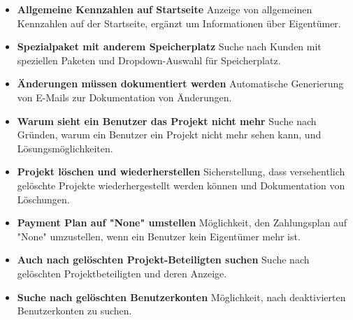 \begin{itemize}
    \item \textbf{Allgemeine Kennzahlen auf Startseite}
        \newline
        Anzeige von allgemeinen Kennzahlen auf der Startseite, ergänzt um Informationen über Eigentümer.
    \item \textbf{Spezialpaket mit anderem Speicherplatz}
        \newline
        Suche nach Kunden mit speziellen Paketen und Dropdown-Auswahl für Speicherplatz.
    \item \textbf{Änderungen müssen dokumentiert werden}
        \newline
        Automatische Generierung von E-Mails zur Dokumentation von Änderungen.
    \item \textbf{Warum sieht ein Benutzer das Projekt nicht mehr}
        \newline
        Suche nach Gründen, warum ein Benutzer ein Projekt nicht mehr sehen kann, und Lösungsmöglichkeiten.
    \item \textbf{Projekt löschen und wiederherstellen}
        \newline
        Sicherstellung, dass versehentlich gelöschte Projekte wiederhergestellt werden können und Dokumentation von Löschungen.
    \item \textbf{Payment Plan auf "None" umstellen}
        \newline
        Möglichkeit, den Zahlungsplan auf "None" umzustellen, wenn ein Benutzer kein Eigentümer mehr ist.
    \item \textbf{Auch nach gelöschten Projekt-Beteiligten suchen}
        \newline
        Suche nach gelöschten Projektbeteiligten und deren Anzeige.
    \item \textbf{Suche nach gelöschten Benutzerkonten}
        \newline
        Möglichkeit, nach deaktivierten Benutzerkonten zu suchen.
\end{itemize}